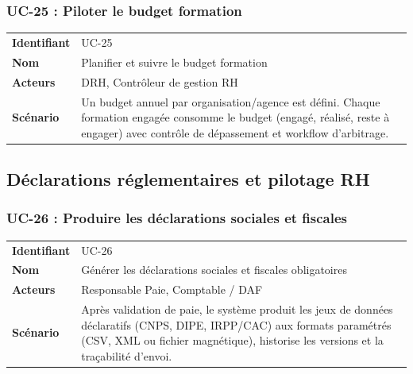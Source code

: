 \documentclass[a4paper,12pt,openany]{book}
\begin{document}
    \subsubsection*{UC-25 : Piloter le budget formation}
    \begin{table}[H]
        \centering
        \begin{tabularx}{\textwidth}{lX}
    \toprule
    \textbf{Identifiant} & UC-25 \\
    \textbf{Nom}         & Planifier et suivre le budget formation \\
    \textbf{Acteurs}     & DRH, Contrôleur de gestion RH \\
    \midrule
    \textbf{Scénario} & Un budget annuel par organisation/agence est défini. Chaque formation engagée consomme le budget (engagé, réalisé, reste à engager) avec contrôle de dépassement et workflow d'arbitrage. \\
    \bottomrule
        \end{tabularx}
    \end{table}


    \subsection{Déclarations réglementaires et pilotage RH}

    \subsubsection*{UC-26 : Produire les déclarations sociales et fiscales}
    \begin{table}[H]
        \centering
        \begin{tabularx}{\textwidth}{lX}
    \toprule
    \textbf{Identifiant} & UC-26 \\
    \textbf{Nom}         & Générer les déclarations sociales et fiscales obligatoires \\
    \textbf{Acteurs}     & Responsable Paie, Comptable / DAF \\
    \midrule
    \textbf{Scénario} & Après validation de paie, le système produit les jeux de données déclaratifs (CNPS, DIPE, IRPP/CAC) aux formats paramétrés (CSV, XML ou fichier magnétique), historise les versions et la traçabilité d'envoi. \\
    \bottomrule
        \end{tabularx}
    \end{table}
\end{document}
